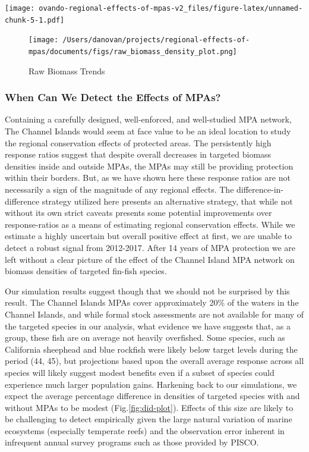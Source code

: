 \documentclass[9pt,twocolumn,twoside,lineno]{pnas-new}
\begin{document}
\texttt{[image: ovando-regional-effects-of-mpas-v2\_files/figure-latex/unnamed-chunk-5-1.pdf]}

\begin{figure}%
  \centering
  \texttt{[image: /Users/danovan/projects/regional-effects-of-mpas/documents/figs/raw\_biomass\_density\_plot.png]}
  \caption{Raw Biomass Trends}
  \label{mpa-effect}
\end{figure}

\hypertarget{when-can-we-detect-the-effects-of-mpas}{%
\subsubsection{When Can We Detect the Effects of
MPAs?}\label{when-can-we-detect-the-effects-of-mpas}}

Containing a carefully designed, well-enforced, and well-studied MPA
network, The Channel Islands would seem at face value to be an ideal
location to study the regional conservation effects of protected areas.
The persistently high response ratios suggest that despite overall
decreases in targeted biomass densities inside and outside MPAs, the
MPAs may still be providing protection within their borders. But, as we
have shown here these response ratios are not necessarily a sign of the
magnitude of any regional effects. The difference-in-difference strategy
utilized here presents an alternative strategy, that while not without
its own strict caveats presents some potential improvements over
response-ratios as a means of estimating regional conservation effects.
While we estimate a highly uncertain but overall positive effect at
first, we are unable to detect a robust signal from 2012-2017. After 14
years of MPA protection we are left without a clear picture of the
effect of the Channel Island MPA network on biomass densities of
targeted fin-fish species.

Our simulation results suggest though that we should not be surprised by
this result. The Channel Islands MPAs cover approximately 20\% of the
waters in the Channel Islands, and while formal stock assessments are
not available for many of the targeted species in our analysis, what
evidence we have suggests that, as a group, these fish are on average
not heavily overfished. Some species, such as California sheephead and
blue rockfish were likely below target levels during the period (44,
45), but projections based upon the overall average response across all
species will likely suggest modest benefits even if a subset of species
could experience much larger population gains. Harkening back to our
simulations, we expect the average percentage difference in densities of
targeted species with and without MPAs to be modest
(Fig.\ref{fig:did-plot}). Effects of this size are likely to be
challenging to detect empirically given the large natural variation of
marine ecosystems (especially temperate reefs) and the observation error
inherent in infrequent annual survey programs such as those provided by
PISCO.
\end{document}
